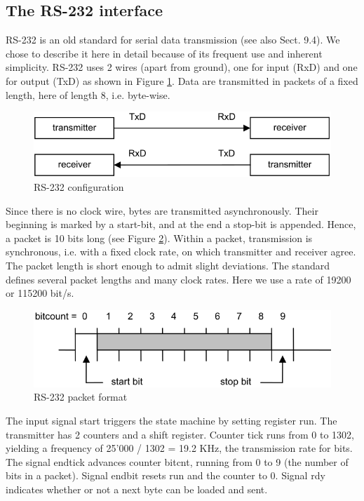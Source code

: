 \subsection{The RS-232 interface}
\label{sub:rs232}
RS-232 is an old standard for serial data transmission (see also Sect. 9.4). We chose to describe it
here in detail because of its frequent use and inherent simplicity. RS-232 uses 2 wires (apart from
ground), one for input (RxD) and one for output (TxD) as shown in Figure \ref{fig:rs232cfg}. Data are
transmitted in packets of a fixed length, here of length 8, i.e. byte-wise.
\begin{figure}[h!]
  \centering
  \includegraphics[width=.9\textwidth]{i/G/b.png}
  \caption{RS-232 configuration}
  \label{fig:rs232cfg}
\end{figure}
Since there is no clock wire,
bytes are transmitted asynchronously. Their beginning is marked by a start-bit, and at the end a
stop-bit is appended. Hence, a packet is 10 bits long (see Figure \ref{fig:rs232pac}). Within a packet,
transmission is synchronous, i.e. with a fixed clock rate, on which transmitter and receiver agree.
The packet length is short enough to admit slight deviations. The standard defines several packet
lengths and many clock rates. Here we use a rate of 19200 or 115200 bit/s.
\begin{figure}[h!]
  \centering
  \includegraphics[width=.96\textwidth]{i/G/c.png}
  \caption{RS-232 packet format}
  \label{fig:rs232pac}
\end{figure}

The input signal start triggers the state machine by setting register run. The transmitter has 2
counters and a shift register. Counter tick runs from 0 to 1302, yielding a frequency of 25’000 / 1302
= 19.2 KHz, the transmission rate for bits. The signal endtick advances counter bitcnt, running from
0 to 9 (the number of bits in a packet). Signal endbit resets run and the counter to 0. Signal rdy
indicates whether or not a next byte can be loaded and sent.

